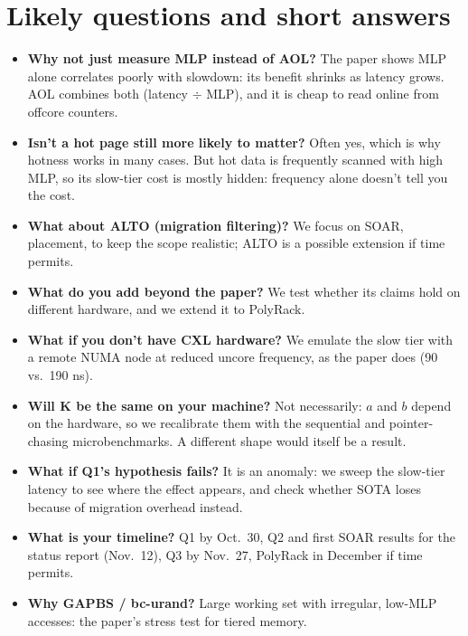 \documentclass[11pt]{article}
\begin{document}
\section{Likely questions and short answers}
\begin{itemize}
  \item \textbf{Why not just measure MLP instead of AOL?} The paper shows MLP
        alone correlates poorly with slowdown: its benefit shrinks as latency
        grows. AOL combines both (latency $\div$ MLP), and it is cheap to read
        online from offcore counters.
  \item \textbf{Isn't a hot page still more likely to matter?} Often yes,
        which is why hotness works in many cases. But hot data is frequently
        scanned with high MLP, so its slow-tier cost is mostly hidden:
        frequency alone doesn't tell you the cost.
  \item \textbf{What about ALTO (migration filtering)?} We focus on SOAR,
        placement, to keep the scope realistic; ALTO is a possible extension
        if time permits.
  \item \textbf{What do you add beyond the paper?} We test whether its claims
        hold on different hardware, and we extend it to PolyRack.
  \item \textbf{What if you don't have CXL hardware?} We emulate the slow tier
        with a remote NUMA node at reduced uncore frequency, as the paper does
        (90 vs.\ 190 ns).
  \item \textbf{Will K be the same on your machine?} Not necessarily: $a$ and
        $b$ depend on the hardware, so we recalibrate them with the sequential
        and pointer-chasing microbenchmarks. A different shape would itself be
        a result.
  \item \textbf{What if Q1's hypothesis fails?} It is an anomaly: we sweep the
        slow-tier latency to see where the effect appears, and check whether
        SOTA loses because of migration overhead instead.
  \item \textbf{What is your timeline?} Q1 by Oct.~30, Q2 and first SOAR
        results for the status report (Nov.~12), Q3 by Nov.~27, PolyRack in
        December if time permits.
  \item \textbf{Why GAPBS / bc-urand?} Large working set with irregular,
        low-MLP accesses: the paper's stress test for tiered memory.
\end{itemize}
\end{document}
